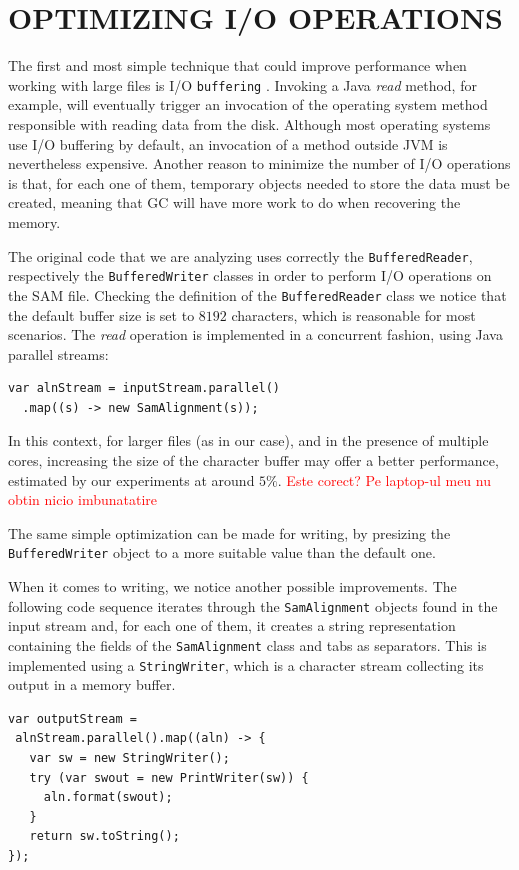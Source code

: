 \documentclass[a4paper,twoside]{article}
\begin{document}
\section{\uppercase{Optimizing I/O Operations}}

The first and most simple technique that could improve performance when working with large files
is I/O {\tt buffering} \cite{oaks:2014}. Invoking a Java {\it read} method, for example, will eventually trigger an invocation of the operating system method responsible with reading data from the disk.
Although most operating systems use I/O buffering by default, an invocation of a method outside JVM is nevertheless expensive. Another reason to minimize the number of I/O operations is that, for each one of them, temporary objects needed to store the data must be created, meaning that GC will have more work to do when recovering the memory.

The original code that we are analyzing uses correctly the {\tt BufferedReader}, respectively the {\tt BufferedWriter} classes in order to perform I/O operations on the SAM file.
Checking the definition of the {\tt BufferedReader} class we notice that the default buffer size is set to $8192$ characters, which is reasonable for most scenarios. The {\it read} operation is implemented in a concurrent fashion, using Java parallel streams:
\begin{verbatim}
var alnStream = inputStream.parallel()
  .map((s) -> new SamAlignment(s));
\end{verbatim}
In this context, for larger files (as in our case), and in the presence of multiple cores, increasing the size of the character buffer may offer a better performance, estimated by our experiments at around $5\%$. \textcolor{red}{Este corect? Pe laptop-ul meu nu obtin nicio imbunatatire}

The same simple optimization can be made for writing, by presizing the {\tt BufferedWriter} object to a more suitable value than the default one.

When it comes to writing, we notice another possible improvements. The following code sequence iterates through the {\tt SamAlignment} objects found in the input stream and, for each one of them, it creates a string representation containing the fields of the  {\tt SamAlignment} class and tabs as separators.
This is implemented using a {\tt StringWriter}, which is a character stream collecting its output in a memory buffer.
\begin{verbatim}
var outputStream = 
 alnStream.parallel().map((aln) -> {
   var sw = new StringWriter();
   try (var swout = new PrintWriter(sw)) {
     aln.format(swout);
   }
   return sw.toString();
});
\end{verbatim}
\end{document}
